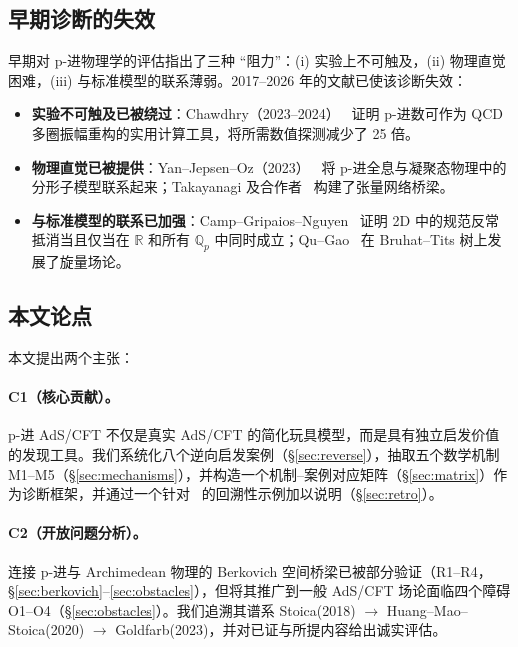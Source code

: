 \documentclass[11pt,a4paper]{ctexart}
\theoremstyle{remark}
\newcommand{\Qp}{\mathbb{Q}_p}
\newcommand{\R}{\mathbb{R}}
\newcommand{\BirTits}{Bruhat--Tits}
\begin{document}
\subsection{早期诊断的失效}

早期对 p-进物理学的评估指出了三种 ``阻力''：(i) 实验上不可触及，(ii) 物理直觉困难，(iii) 与标准模型的联系薄弱。2017--2026 年的文献已使该诊断失效：

\begin{itemize}[leftmargin=2em]
    \item \textbf{实验不可触及已被绕过}：Chawdhry（2023--2024）~\cite{C23,C24} 证明 p-进数可作为 QCD 多圈振幅重构的实用计算工具，将所需数值探测减少了 25 倍。
    \item \textbf{物理直觉已被提供}：Yan--Jepsen--Oz（2023）~\cite{YJO23} 将 p-进全息与凝聚态物理中的分形子模型联系起来；Takayanagi 及合作者~\cite{OT24} 构建了张量网络桥梁。
    \item \textbf{与标准模型的联系已加强}：Camp--Gripaios--Nguyen~\cite{CGN24} 证明 2D 中的规范反常抵消当且仅当在 $\R$ 和所有 $\Qp$ 中同时成立；Qu--Gao~\cite{QG20} 在 \BirTits{} 树上发展了旋量场论。
\end{itemize}

\subsection{本文论点}

本文提出两个主张：

\paragraph{C1（核心贡献）。}
p-进 AdS/CFT 不仅是真实 AdS/CFT 的简化玩具模型，而是具有独立启发价值的发现工具。我们系统化八个逆向启发案例（\S\ref{sec:reverse}），抽取五个数学机制 M1--M5（\S\ref{sec:mechanisms}），并构造一个机制--案例对应矩阵（\S\ref{sec:matrix}）作为诊断框架，并通过一个针对~\cite{HJ24} 的回溯性示例加以说明（\S\ref{sec:retro}）。

\paragraph{C2（开放问题分析）。}
连接 p-进与 Archimedean 物理的 Berkovich 空间桥梁已被部分验证（R1--R4，\S\ref{sec:berkovich}--\ref{sec:obstacles}），但将其推广到一般 AdS/CFT 场论面临四个障碍 O1--O4（\S\ref{sec:obstacles}）。我们追溯其谱系 Stoica(2018) $\to$ Huang--Mao--Stoica(2020) $\to$ Goldfarb(2023)，并对已证与所提内容给出诚实评估。
\end{document}
